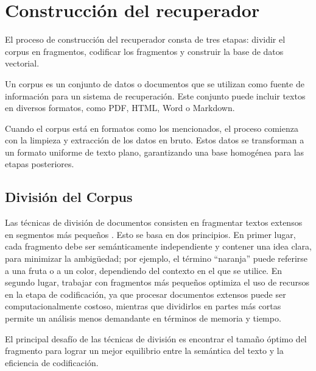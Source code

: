 \documentclass{article}
\begin{document}
\section{Construcción del recuperador}

El proceso de construcción del recuperador consta de tres etapas: dividir el corpus en fragmentos, codificar los fragmentos y construir la base de datos vectorial.

Un corpus es un conjunto de datos o documentos que se utilizan como fuente de información para un sistema de recuperación. Este conjunto puede incluir textos en diversos formatos, como PDF, HTML, Word o Markdown.

Cuando el corpus está en formatos como los mencionados, el proceso comienza con la limpieza y extracción de los datos en bruto. Estos datos se transforman a un formato uniforme de texto plano, garantizando una base homogénea para las etapas posteriores.

\subsection{División del Corpus}

Las técnicas de división de documentos consisten en fragmentar textos extensos en segmentos más pequeños \cite{gong2020recurrentchunkingmechanismslongtext}. Esto se basa en dos principios. En primer lugar, cada fragmento debe ser semánticamente independiente y contener una idea clara, para minimizar la ambigüedad; por ejemplo, el término ``naranja'' puede referirse a una fruta o a un color, dependiendo del contexto en el que se utilice. En segundo lugar, trabajar con fragmentos más pequeños optimiza el uso de recursos en la etapa de codificación, ya que procesar documentos extensos puede ser computacionalmente costoso, mientras que dividirlos en partes más cortas permite un análisis menos demandante en términos de memoria y tiempo.

El principal desafío de las técnicas de división es encontrar el tamaño óptimo del fragmento para lograr un mejor equilibrio entre la semántica del texto y la eficiencia de codificación.
\end{document}
